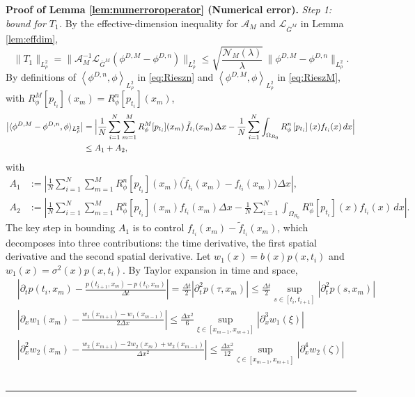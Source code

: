 \documentclass[12pt]{article}
\newenvironment{proof}[1][Proof]{\noindent\textbf{#1.} }{\ \rule{0.5em}{0.5em}}
\numberwithin{equation}{section}
\numberwithin{theorem}{section}
\begin{document}
\begin{proof}[Proof of Lemma \ref{lem:numerroroperator} (Numerical error)]
\medskip\noindent
\emph{Step 1: bound for $T_1$.}
By the effective-dimension inequality for $\mathcal{A}_M$ and $\mathcal{L}_{\bar{G}^M}$ in Lemma \ref{lem:effdim},
$$
\|T_1\|_{L^2_\rho}
= \|\mathcal{A}_M^{-1}\mathcal{L}_{\bar{G}^M}(\phi^{D,M}-\phi^{D,n})\|_{L^2_\rho}
\le \sqrt{\frac{\mathcal{N}_M(\lambda)}{\lambda}}\,\|\phi^{D,M}-\phi^{D,n}\|_{L^2_\rho}.
$$
By definitions of $\left\langle\phi^{D, n}, \phi\right\rangle_{L^2_{\rho}} $ in \eqref{eq:Rieszn} and $\left\langle \phi^{D,M},\phi\right\rangle_{L_\rho^2}$ in \eqref{eq:RieszM}, with $R_\phi^M[p_{t_i}](x_m) = R_\phi^n[p_{t_i}](x_m)$, 
$$
\begin{aligned}
\bigl|\langle\phi^{D, M}-\phi^{D,n}, \phi\rangle_{L^2_{\rho}}\bigr|
&= \Bigl| \frac{1}{N}\sum_{i=1}^N\sum_{m=1}^M 
  R_\phi^M[p_{t_i}](x_m)\,\tilde f_{t_i}(x_m)\,\Delta x 
 - \frac{1}{N} \sum_{i=1}^N \int_{\Omega_{R_0}} R^n_{\phi}\left[p_{t_i}\right](x) f_{t_i}(x)\, d x\Bigr| \\
&\leq A_1 + A_2,
\end{aligned}
$$
with
$$
\begin{aligned}
A_1 
&:= \left|\frac{1}{N}\sum_{i=1}^N\sum_{m=1}^M
  R_\phi^n[p_{t_i}](x_m)\bigl(\tilde f_{t_i}(x_m)-f_{t_i}(x_m)\bigr)\Delta x\right|,\\
A_2 
&:= \left|\frac{1}{N}\sum_{i=1}^N\sum_{m=1}^M
  R_\phi^n[p_{t_i}](x_m)f_{t_i}(x_m)\Delta x
 - \frac{1}{N}\sum_{i=1}^N\int_{\Omega_{R_0}}R_\phi^n[p_{t_i}](x)f_{t_i}(x)\,dx\right|.
\end{aligned}
$$
The key step in bounding $A_1$ is to control $f_{t_i}\left(x_m\right)-\tilde{f}_{t_i}\left(x_m\right)$, which decomposes into three contributions: the time derivative, the first spatial derivative and the second spatial derivative. Let $w_1(x) = b(x)p(x,t_i)$ and $w_1(x) = \sigma^2(x)p(x,t_i)$. By Taylor expansion in time and space, 
\begin{equation}
\label{eq:diffbound}
\begin{aligned}
&\left|\partial_t p\left(t_i, x_m\right)-\frac{p\left(t_{i+1}, x_m\right)-p\left(t_i, x_m\right)}{\Delta t}\right|=\frac{\Delta t}{2}\left|\partial^2_{t}p\left(\tau, x_m\right)\right| \le \frac{\Delta t}{2} \sup _{s \in\left[t_i, t_{i+1}\right]}\left|\partial^2_{t}p(s,  x_m)\right| \\
&\left|\partial_x w_1\left(x_m\right) -\frac{w_1(x_{m+1})-w_1(x_{m-1})}{2 \Delta x}\right| \leq \frac{\Delta x^2}{6} \sup _{\xi \in\left[x_{m-1}, x_{m+1}\right]}\left|\partial^3_xw_1\left(\xi\right)\right|\\
& \left|\partial^2_{x} w_2\left( x_m\right)-\frac{w_2\left(x_{m+1}\right) -2w_2\left(x_m\right)+w_2 \left(x_{m-1}\right)}{\Delta x^2}\right| \leq \frac{\Delta x^2}{12}\sup _{\zeta \in\left[x_{m-1}, x_{m+1}\right]}\left|\partial^4_{x} w_2 \left(\zeta\right)\right|

\end{aligned}
\end{equation}
\end{proof}
\end{document}
